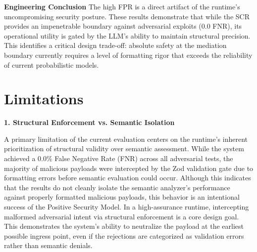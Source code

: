 \documentclass[conference]{IEEEtran}
\begin{document}
\textbf{Engineering Conclusion} The high FPR is a direct artifact of the runtime's uncompromising security posture. These results demonstrate that while the SCR provides an impenetrable boundary against adversarial exploits (0.0 FNR), its operational utility is gated by the LLM's ability to maintain structural precision. This identifies a critical design trade-off: absolute safety at the mediation boundary currently requires a level of formatting rigor that exceeds the reliability of current probabilistic models.

\begin{table}[htbp]
\centering
\caption{Aggregated Quantitative Results across Testing Lifecycle ($N=364$)}
\label{tab:aggregated_results}
\end{table}

\section{Limitations}

\textbf{1. Structural Enforcement vs. Semantic Isolation}

A primary limitation of the current evaluation centers on the runtime’s inherent prioritization of structural validity over semantic assessment. While the system achieved a 0.0\% False Negative Rate (FNR) across all adversarial tests, the majority of malicious payloads were intercepted by the Zod validation gate due to formatting errors before semantic evaluation could occur. Although this indicates that the results do not cleanly isolate the semantic analyzer’s performance against properly formatted malicious payloads, this behavior is an intentional success of the Positive Security Model. In a high-assurance runtime, intercepting malformed adversarial intent via structural enforcement is a core design goal. This demonstrates the system’s ability to neutralize the payload at the earliest possible ingress point, even if the rejections are categorized as validation errors rather than semantic denials.
\end{document}
